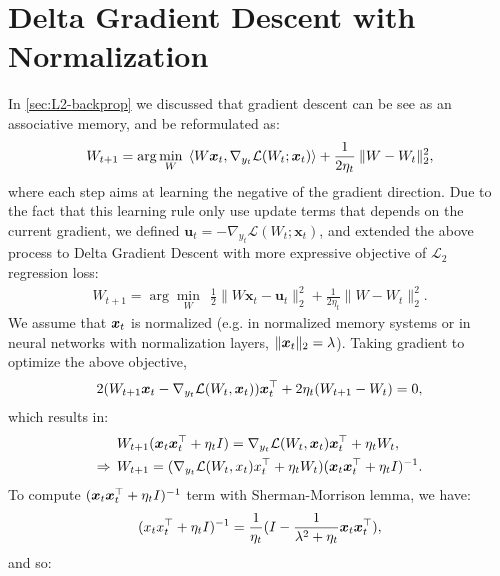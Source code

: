 \section{Delta Gradient Descent with Normalization}\label{app:DGD}
In \autoref{sec:L2-backprop} we discussed that gradient descent can be see as an associative memory, and be reformulated as:
\begin{align}
    W_{t+1} = \arg\min_{W} \:\: \langle W\boldsymbol{x}_t, \nabla_{y_t} \mathcal{L}(W_t;\boldsymbol{x}_t) \rangle + \frac{1}{2\eta_t} \: \|W - W_{t}\|^{2}_2,
\end{align}
where each step aims at learning the negative of the gradient direction. Due to the fact that this learning rule only use update terms that depends on the current gradient, we defined $\mathbf{u}_t = -\nabla_{y_t} \mathcal{L}(W_t;\boldsymbol{x}_t)$, and extended the above process to Delta Gradient Descent with more expressive objective of $\mathcal{L}_2$ regression loss:
\begin{align}
    W_{t+1} = \arg\min_{W} \:\: \frac{1}{2}\|W\boldsymbol{x}_t - \mathbf{u}_t \|^{2}_2 +  \frac{1}{2\eta_t}\|W - W_{t}\|^{2}_2.
\end{align}
We assume that $\boldsymbol{x}_t$ is normalized (e.g.  in normalized memory systems or in neural networks with normalization layers, $\|\boldsymbol{x}_t\|_2 = \lambda$). Taking gradient to optimize the above objective, 
\begin{align}
    2(W_{t+1}\boldsymbol{x}_t - \nabla_{y_t} \mathcal{L}(W_t,\boldsymbol{x}_t))\boldsymbol{x}_t^{\top} + 2 \eta_t (W_{t+1}-W_t) = 0,
\end{align}
which results in:
\begin{align}
    &W_{t+1}(\boldsymbol{x}_t \boldsymbol{x}_t^{\top} + \eta_t I) = \nabla_{y_t} \mathcal{L}(W_t,\boldsymbol{x}_t) \boldsymbol{x}_t^{\top} + \eta_t W_t, \\
    \Rightarrow\:\:&W_{t+1} = (\nabla_{y_t} \mathcal{L}(W_t,x_t) x_t^{\top} + \eta_t W_t)(\boldsymbol{x}_t \boldsymbol{x}_t^{\top} + \eta_t I)^{-1}.
\end{align}
To compute $( \boldsymbol{x}_t \boldsymbol{x}_t^{\top} + \eta_t I)^{-1}$ term with  Sherman-Morrison lemma, we have:
\begin{align}
    (x_tx_t^{\top} + \eta_t I)^{-1} = \frac{1}{\eta_t} (I - \frac{1}{\lambda^2+\eta_t} \boldsymbol{x}_t \boldsymbol{x}_t^{\top}),
\end{align}
and so:
